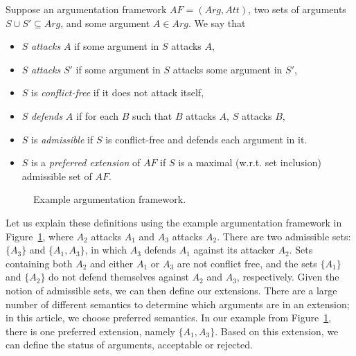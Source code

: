 \begin{definition} Suppose an argumentation framework $AF=(Arg,Att)$, two sets of arguments $S\cup S'\subseteq Arg$, and some argument $A\in Arg$. We say that
\begin{itemize}
\item $S$ \emph{attacks} $A$ if some argument in $S$ attacks $A$,
\item $S$ \emph{attacks} $S'$ if some argument in $S$ attacks some argument in $S'$,
\item $S$ is \emph{conflict-free} if it does not attack itself,
\item $S$ \emph{defends} $A$ if for each $B$ such that $B$ attacks $A$, $S$ attacks $B$,
\item $S$ is \emph{admissible} if $S$ is conflict-free and defends each argument in it.
\item $S$ is a \emph{preferred extension} of $AF$ if $S$ is a maximal (w.r.t. set inclusion) admissible set of $AF$.
\end{itemize}
\end{definition}

\begin{figure}[ht!]
\centering
{}
\caption{Example argumentation framework.}
\label{fig:goalmodeling:arg2}
\end{figure}

Let us explain these definitions using the example argumentation framework in Figure~\ref{fig:goalmodeling:arg2}, where $A_2$ attacks $A_1$ and $A_3$ attacks $A_2$. There are two admissible sets: $\{A_3\}$ and $\{A_1, A_3\}$, in which $A_3$ defends $A_1$ against its attacker $A_2$. Sets containing both $A_2$ and either $A_1$ or $A_3$ are not conflict free, and the sets $\{A_1\}$ and $\{A_2\}$ do not defend themselves against $A_2$ and $A_3$, respectively. Given the notion of admissible sets, we can then define our extensions. There are a large number of different semantics to determine which arguments are in an extension; in this article, we choose preferred semantics. In our example from Figure~\ref{fig:goalmodeling:arg2}, there is one preferred extension, namely $\{A_1,A_3\}$. Based on this extension, we can define the status of arguments, acceptable or rejected. 

